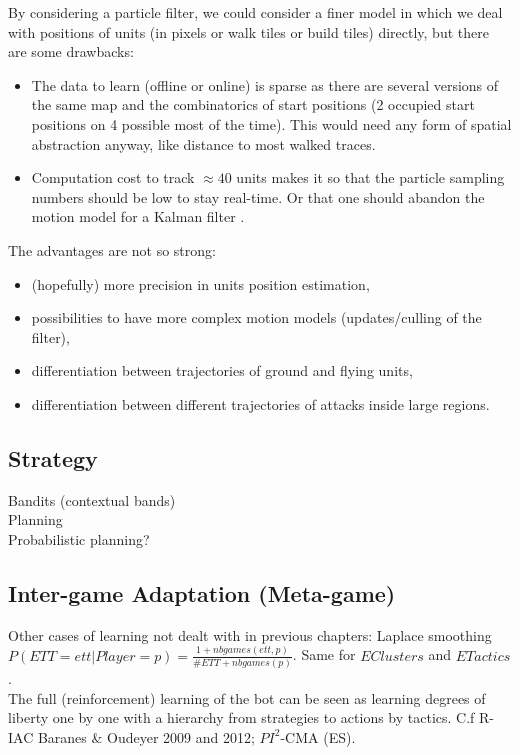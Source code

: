 By considering a particle filter, we could consider a finer model in which we deal with positions of units (in pixels or walk tiles or build tiles) directly, but there are some drawbacks:
\begin{itemize}
    \item The data to learn (offline or online) is sparse as there are several versions of the same map and the combinatorics of start positions (2 occupied start positions on 4 possible most of the time). This would need any form of spatial abstraction anyway, like distance to most walked traces.
    \item Computation cost to track $\approx 40$ units makes it so that the particle sampling numbers should be low to stay real-time. Or that one should abandon the motion model for a Kalman filter \citep{Kalman1960}. 
\end{itemize}
The advantages are not so strong: 
\begin{itemize}
    \item (hopefully) more precision in units position estimation,
    \item possibilities to have more complex motion models (updates/culling of the filter),
    \item differentiation between trajectories of ground and flying units,
    \item differentiation between different trajectories of attacks inside large regions.
\end{itemize}



\subsection{Strategy}
Bandits (contextual bands)\\
Planning \citep{Wolfe11}\\
Probabilistic planning?

\subsection{Inter-game Adaptation (Meta-game)}
Other cases of learning not dealt with in previous chapters:
\citep{metalevelbehavioradaptrts}
Laplace smoothing $P(ETT=ett|Player=p)= \frac{1 + nbgames(ett,p)}{\#ETT + nbgames(p)}$. Same for $EClusters$ and $ETactics$.\\

The full (reinforcement) learning of the bot can be seen as learning degrees of liberty one by one with a hierarchy from strategies to actions by tactics. C.f R-IAC Baranes \& Oudeyer 2009 and 2012; $PI^2$-CMA (ES).\\

